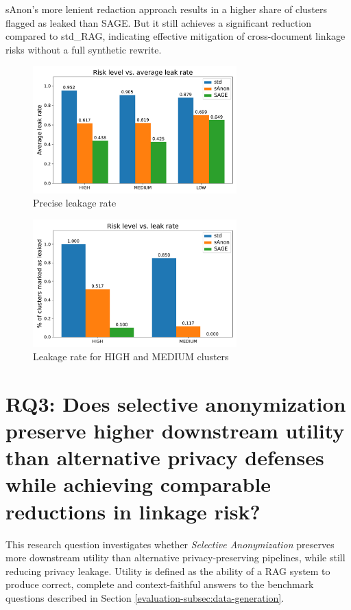 sAnon's more lenient redaction approach results in a higher share of clusters flagged as leaked than SAGE. But it still achieves a significant reduction compared to std\_RAG, indicating effective mitigation of cross-document linkage risks without a full synthetic rewrite. 

\begin{figure}[h] 
    \centering
    \includegraphics[width=0.7\textwidth]{figures/r1_precise_leak.pdf}
    \caption{Precise leakage rate}
    \label{evaluation-fig:precise_leakage}
\end{figure}  

\begin{figure}[h]
    \centering
    \includegraphics[width=0.7\textwidth]{figures/r1_leak_flag.pdf}
    \caption{Leakage rate for HIGH and MEDIUM clusters}
    \label{evaluation-fig:leakage_label}
\end{figure}  


\section{RQ3: Does selective anonymization preserve higher downstream utility than alternative privacy defenses while achieving comparable reductions in linkage risk?}

This research question investigates whether \textit{Selective Anonymization} preserves more downstream utility than alternative privacy-preserving pipelines, while still reducing privacy leakage. Utility is defined as the ability of a \ac{RAG} system to produce correct, complete and context-faithful answers to the benchmark questions described in Section \ref{evaluation-subsec:data-generation}.

